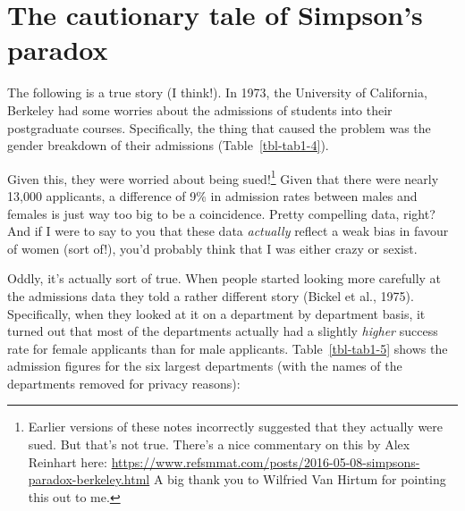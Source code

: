 \documentclass[
  a4paper,
]{book}
\begin{document}
\section{The cautionary tale of Simpson's
paradox}\label{the-cautionary-tale-of-simpsons-paradox}

The following is a true story (I think!). In 1973, the University of
California, Berkeley had some worries about the admissions of students
into their postgraduate courses. Specifically, the thing that caused the
problem was the gender breakdown of their admissions
(Table~\ref{tbl-tab1-4}).

\begin{table}

\caption{\label{tbl-tab1-4}Berkeley students by gender}

\centering
{}

\end{table}%

Given this, they were worried about being sued!\footnote{Earlier
  versions of these notes incorrectly suggested that they actually were
  sued. But that's not true. There's a nice commentary on this by Alex
  Reinhart here:
  \url{https://www.refsmmat.com/posts/2016-05-08-simpsons-paradox-berkeley.html}
  A big thank you to Wilfried Van Hirtum for pointing this out to me.}
Given that there were nearly 13,000 applicants, a difference of 9\% in
admission rates between males and females is just way too big to be a
coincidence. Pretty compelling data, right? And if I were to say to you
that these data \emph{actually} reflect a weak bias in favour of women
(sort of!), you'd probably think that I was either crazy or sexist.

Oddly, it's actually sort of true. When people started looking more
carefully at the admissions data they told a rather different story
(Bickel et al., 1975). Specifically, when they looked at it on a
department by department basis, it turned out that most of the
departments actually had a slightly \emph{higher} success rate for
female applicants than for male applicants. Table~\ref{tbl-tab1-5} shows
the admission figures for the six largest departments (with the names of
the departments removed for privacy reasons):
\end{document}
